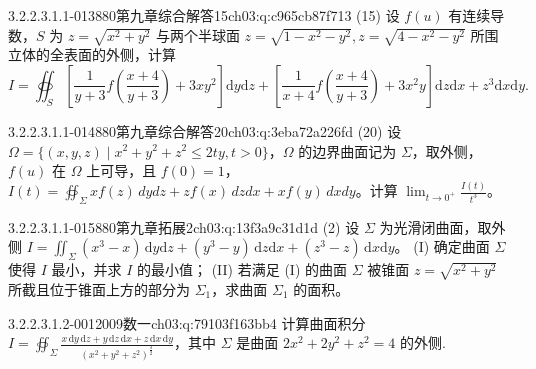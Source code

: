 \begin{q}{3.2.2.3.1.1-013}{880第九章综合解答15}{ch03:q:c965cb87f713}
(15) 设 $f(u)$ 有连续导数，$S$ 为 $z=\sqrt{x^2+y^2}$ 与两个半球面 $z=\sqrt{1-x^2-y^2},z=\sqrt{4-x^2-y^2}$ 所围立体的全表面的外侧，计算
\[
I=\oiint_S\left[\frac{1}{y+3}f\left(\frac{x+4}{y+3}\right)+3xy^2\right]\mathrm{d}y\mathrm{d}z+\left[\frac{1}{x+4}f\left(\frac{x+4}{y+3}\right)+3x^2y\right]\mathrm{d}z\mathrm{d}x+z^3\mathrm{d}x\mathrm{d}y.
\]
\end{q}

\begin{q}{3.2.2.3.1.1-014}{880第九章综合解答20}{ch03:q:3eba72a226fd}
(20) 设 $\Omega = \{(x,y,z) \mid x^2+y^2+z^2 \le 2ty, t>0\}$，$\Omega$ 的边界曲面记为 $\Sigma$，取外侧，$f(u)$ 在 $\Omega$ 上可导，且 $f(0)=1$，$I(t)=\oiint_{\Sigma} x f(z)\,dy dz+z f(x)\,dz dx+x f(y)\,dx dy$。计算 $\displaystyle \lim_{t\to 0^+} \frac{I(t)}{t^3}$。
\end{q}

\begin{q}{3.2.2.3.1.1-015}{880第九章拓展2}{ch03:q:13f3a9c31d1d}
(2) 设 $\Sigma$ 为光滑闭曲面，取外侧 $\displaystyle I=\iint_{\Sigma}(x^3-x)\,\mathrm{d}y\mathrm{d}z+(y^3-y)\,\mathrm{d}z\mathrm{d}x+(z^3-z)\,\mathrm{d}x\mathrm{d}y$。
(I) 确定曲面 $\Sigma$ 使得 $I$ 最小，并求 $I$ 的最小值；
(II) 若满足 (I) 的曲面 $\Sigma$ 被锥面 $z=\sqrt{x^2+y^2}$ 所截且位于锥面上方的部分为 $\Sigma_1$，求曲面 $\Sigma_1$ 的面积。
\end{q}

\par\addvspace{2.4ex}\noindent
\begin{minipage}{\linewidth}

\begin{q}{3.2.2.3.1.2-001}{2009数一}{ch03:q:79103f163bb4}
计算曲面积分 $I=\oiint_{\Sigma}\frac{x\,\mathrm{d}y\,\mathrm{d}z+y\,\mathrm{d}z\,\mathrm{d}x+z\,\mathrm{d}x\,\mathrm{d}y}{(x^2+y^2+z^2)^{\frac{3}{2}}}$，其中 $\Sigma$ 是曲面 $2x^2+2y^2+z^2=4$ 的外侧.
\end{q}
\end{minipage}


